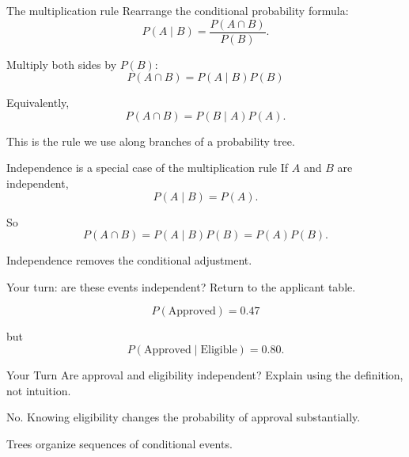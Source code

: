 \documentclass[11pt,aspectratio=169]{beamer}
\newcommand{\yourturn}[1]{%
\begin{center}
\begin{minipage}{0.90\textwidth}
\begin{alertblock}{Your Turn}
#1
\end{alertblock}
\end{minipage}
\end{center}}
\newcommand{\prob}[1]{P\!\left(#1\right)}
\newcommand{\condprob}[2]{P\!\left(#1\mid #2\right)}
\begin{document}
\begin{frame}{The multiplication rule}
Rearrange the conditional probability formula:
\[
\condprob{A}{B}=\frac{\prob{A\cap B}}{\prob{B}}.
\]

Multiply both sides by $\prob{B}$:
\[
\boxed{\prob{A\cap B}=\condprob{A}{B}\prob{B}}
\]

Equivalently,
\[
\boxed{\prob{A\cap B}=\condprob{B}{A}\prob{A}}.
\]

\vfill
This is the rule we use along branches of a probability tree.
\end{frame}

\begin{frame}{Independence is a special case of the multiplication rule}
If $A$ and $B$ are independent,
\[
\condprob{A}{B}=\prob{A}.
\]

So
\[
\prob{A\cap B}=\condprob{A}{B}\prob{B}
=\prob{A}\prob{B}.
\]

\vfill
\begin{center}
\Large Independence removes the conditional adjustment.
\end{center}
\end{frame}

\begin{frame}{Your turn: are these events independent?}
Return to the applicant table.

\[
\prob{\text{Approved}}=0.47
\]

but
\[
\condprob{\text{Approved}}{\text{Eligible}}=0.80.
\]

\yourturn{Are approval and eligibility independent? Explain using the definition, not intuition.}

\vfill
No. Knowing eligibility changes the probability of approval substantially.
\end{frame}

\begin{frame}[standout]
\Large Trees organize sequences of conditional events.
\end{frame}
\end{document}
